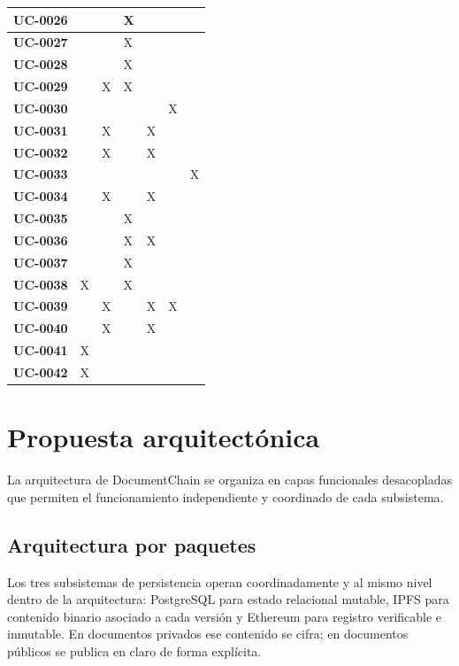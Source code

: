 \documentclass[11pt, a4paper]{article}
\begin{document}
{\begin{center}
{\begin{longtable}{|p{2.2cm}|p{2.0cm}|p{2.0cm}|p{2.0cm}|p{2.0cm}|p{2.0cm}|p{2.0cm}|}
\hline
\textbf{UC-0026} &  &  & X &  &  &  \\
\hline
\textbf{UC-0027} &  &  & X &  &  &  \\
\hline
\textbf{UC-0028} &  &  & X &  &  &  \\
\hline
\textbf{UC-0029} &  & X & X &  &  &  \\
\hline
\textbf{UC-0030} &  &  &  &  & X &  \\
\hline
\textbf{UC-0031} &  & X &  & X &  &  \\
\hline
\textbf{UC-0032} &  & X &  & X &  &  \\
\hline
\textbf{UC-0033} &  &  &  &  &  & X \\
\hline
\textbf{UC-0034} &  & X &  & X &  &  \\
\hline
\textbf{UC-0035} &  &  & X &  &  &  \\
\hline
\textbf{UC-0036} &  &  & X & X &  &  \\
\hline
\textbf{UC-0037} &  &  & X &  &  &  \\
\hline
\textbf{UC-0038} & X &  & X &  &  &  \\
\hline
\textbf{UC-0039} &  & X &  & X & X &  \\
\hline
\textbf{UC-0040} &  & X &  & X &  &  \\
\hline
\textbf{UC-0041} & X &  &  &  &  &  \\
\hline
\textbf{UC-0042} & X &  &  &  &  &  \\
\hline

\end{longtable}
}
\end{center}


\section{Propuesta arquitectónica}

La arquitectura de DocumentChain se organiza en capas funcionales desacopladas que permiten el funcionamiento independiente y coordinado de cada subsistema.

\subsection{Arquitectura por paquetes}

Los tres subsistemas de persistencia operan coordinadamente y al mismo nivel dentro de la arquitectura: PostgreSQL para estado relacional mutable, IPFS para contenido binario asociado a cada versión y Ethereum para registro verificable e inmutable. En documentos privados ese contenido se cifra; en documentos públicos se publica en claro de forma explícita.

}
\end{document}
